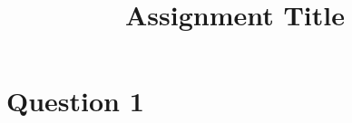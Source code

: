 \documentclass[a4paper, 11pt]{article}
\title{Assignment Title}
\author{}
\theoremstyle{plain}
\theoremstyle{definition}
\begin{document}
\maketitle

\section*{Question 1}



\end{document}
